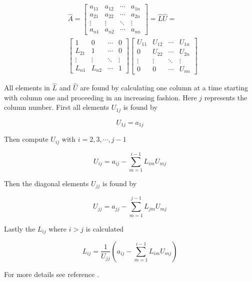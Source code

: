 \documentclass[twoside,twocolumn]{article}
\begin{document}
\begin{align*}
&\hat{A}= 
\begin{bmatrix}
a_{11}&a_{12}&\cdots &a_{1n}\\
a_{21}&a_{22}& \cdots & a_{2n}\\
\vdots&\vdots&\ddots&\vdots\\
a_{n1}&a_{n2}&\cdots&a_{nn}
\end{bmatrix}=\hat{L}\hat{U}=\\
&\begin{bmatrix}
1&0&\cdots &0\\
L_{21}&1& \cdots & 0\\
\vdots&\vdots&\ddots&\vdots\\
L_{n1}&L_{n2}&\cdots&1
\end{bmatrix}
\begin{bmatrix}
U_{11}&U_{12}&\cdots &U_{1n}\\
0&U_{22}& \cdots & U_{2n}\\
\vdots&\vdots&\ddots&\vdots\\
0&0&\cdots&U_{nn}\end{bmatrix} 
\end{align*}

All elements in $\hat{L}$ and $\hat{U}$ are found by calculating one column at a time starting with column one and proceeding in an increasing fashion. Here $j$ represents the column number.
First all elements $U_{1j}$ is found by

\begin{equation*}
    U_{1j} = a_{1j}    
\end{equation*}

Then compute $U_{ij}$ with $i = 2,3,\cdots,j-1$

\begin{equation*}
    U_{ij} = a_{ij}-\sum_{m=1}^{i-1}L_{im}U_{mj} 
\end{equation*}

Then the diagonal elements $U_{jj}$ is found by

\begin{equation*}
    U_{jj} = a_{jj}-\sum_{m=1}^{j-1}L_{jm}U_{mj} 
\end{equation*}

Lastly the $L_{ij}$ where $i>j$ is calculated

\begin{equation*}
    L_{ij} = \frac{1}{U_{jj}}\left(a_{ij}-\sum_{m=1}^{i-1}L_{im}U_{mj}\right)
\end{equation*}

For more details see reference \cite{compfys}.
\end{document}
